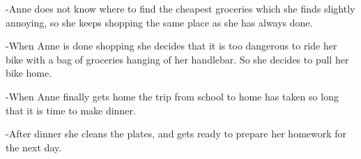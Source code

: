 -Anne does not know where to find the cheapest groceries which she finds slightly annoying, so she keeps shopping the same place as she has always done.

-When Anne is done shopping she decides that it is too dangerous to ride her bike with a bag of groceries hanging of her handlebar. So she decides to pull her bike home.

-When Anne finally gets home the trip from school to home has taken so long that it is time to make dinner.

-After dinner she cleans the plates, and gets ready to prepare her homework for the next day. 
